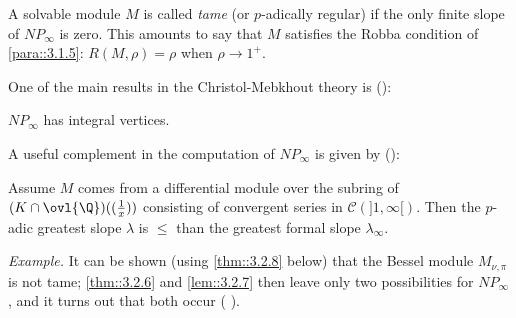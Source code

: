 A solvable module $M$ is called {\it tame} (or $p$-adically regular) if
the only finite slope of $NP_\infty$ is zero. 
This amounts to say that $M$ satisfies the Robba condition of
\ref{para::3.1.5}: $R(M,\rho)=\rho$ when $\rho\to 1^+$.

\medskip One of the main results in the Christol-Mebkhout theory is
(\cite{sltdldedp3}): 
 
\begin{thm}\label{thm::3.2.6}
 $NP_\infty$ has integral vertices. 
\end{thm}
 
\par \noindent  A useful complement in the computation of $NP_\infty$
is given by (\cite{andre:_repres_bessel}):

\begin{lem}\label{lem::3.2.7} Assume $M$ comes from a differential module
 over the subring of $(K\cap \ovl{\Q})((\frac{1}{x}))$ consisting of
 convergent series in  $\mathcal{C}(]1,\infty[)$. Then the $p$-adic
 greatest slope $\lambda$ is $\leq$ than the greatest formal slope
 $\lambda_\infty$.
\end{lem}

 \noindent
 {\it Example.} It can be shown (using \ref{thm::3.2.8} below) that the
 Bessel module $M_{\nu,\pi}$ is not tame; \ref{thm::3.2.6} and
 \ref{lem::3.2.7} then leave only two possibilities for 
 $NP_\infty$, and it turns out that both occur  (\cf
 \cite{andre:_repres_bessel}).

